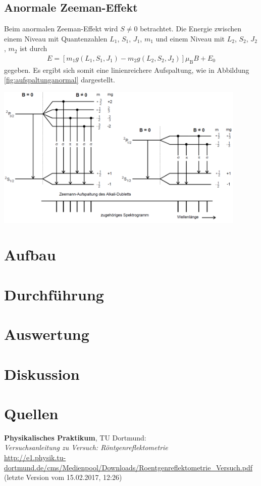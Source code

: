 \documentclass[captions=tableheading]{scrartcl}
\newcommand{\indx}[1]{\text{#1}}
\begin{document}
\subsection{Anormale Zeeman-Effekt}
Beim anormalen Zeeman-Effekt wird $S\neq 0$ betrachtet. 
Die Energie zwischen einem Niveau mit Quantenzahlen $L_1$, $S_1$, $J_1$, $m_1$ und einem Niveau mit $L_2$, $S_2$, $J_2$, $m_2$ ist durch 
\begin{align}
E=\left[ m_1 g\left(L_1,S_1,J_1 \right) - m_2 g\left(L_2,S_2,J_2 \right) \right] \mu_\indx{B}B+E_0
\end{align}
gegeben.
Es ergibt sich somit eine linienreichere Aufspaltung, wie in Abbildung \ref{fig:aufspaltunganormal} dargestellt.
\begin{center}
	\includegraphics[width=12cm]{images/aufspaltunganormal.png}
	\label{fig:aufspaltunganormal}
\end{center}
\section{Aufbau}


\section{Durchführung}


\section{Auswertung}


\section{Diskussion}

\section{Quellen}
\begin{enumerate}[label={[\arabic*]}]
\item \label{q:anleitung} \textbf{Physikalisches Praktikum}, TU Dortmund: \\
\textit{Versuchsanleitung zu Versuch: Röntgenreflektometrie} \\
\url{http://e1.physik.tu-dortmund.de/cms/Medienpool/Downloads/Roentgenreflektometrie_Versuch.pdf} (letzte Version vom 15.02.2017, 12:26)
\end{enumerate}
\end{document}
